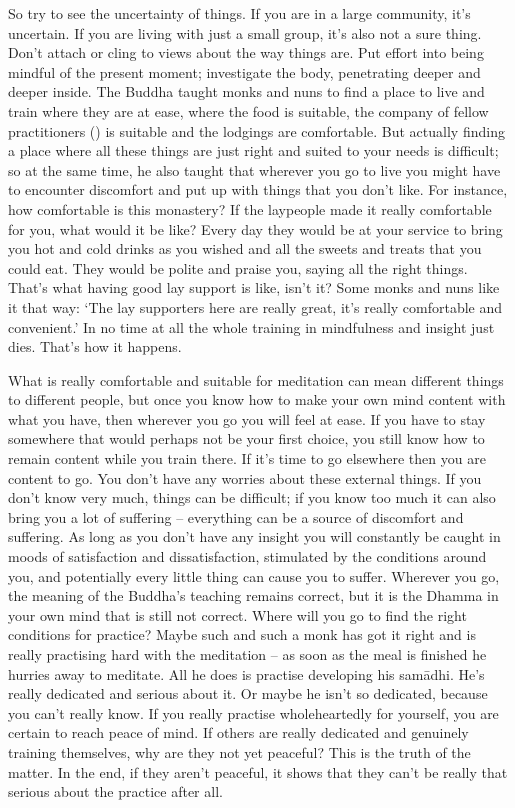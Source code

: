 So try to see the uncertainty of things. If you are in a large community, it's uncertain. If you are living with just a small group, it's also not a sure thing. Don't attach or cling to views about the way things are. Put effort into being mindful of the present moment; investigate the body, penetrating deeper and deeper inside. The Buddha taught monks and nuns to find a place to live and train where they are at ease, where the food is suitable, the company of fellow practitioners () is suitable and the lodgings are comfortable. But actually finding a place where all these things are just right and suited to your needs is difficult; so at the same time, he also taught that wherever you go to live you might have to encounter discomfort and put up with things that you don't like. For instance, how comfortable is this monastery? If the laypeople made it really comfortable for you, what would it be like? Every day they would be at your service to bring you hot and cold drinks as you wished and all the sweets and treats that you could eat. They would be polite and praise you, saying all the right things. That's what having good lay support is like, isn't it? Some monks and nuns like it that way: `The lay supporters here are really great, it's really comfortable and convenient.' In no time at all the whole training in mindfulness and insight just dies. That's how it happens.

What is really comfortable and suitable for meditation can mean different things to different people, but once you know how to make your own mind content with what you have, then wherever you go you will feel at ease. If you have to stay somewhere that would perhaps not be your first choice, you still know how to remain content while you train there. If it's time to go elsewhere then you are content to go. You don't have any worries about these external things. If you don't know very much, things can be difficult; if you know too much it can also bring you a lot of suffering -- everything can be a source of discomfort and suffering. As long as you don't have any insight you will constantly be caught in moods of \mbox{satisfaction} and dissatisfaction, stimulated by the conditions around you, and potentially every little thing can cause you to suffer. Wherever you go, the meaning of the Buddha's teaching remains correct, but it is the Dhamma in your own mind that is still not correct. Where will you go to find the right conditions for practice? Maybe such and such a monk has got it right and is really practising hard with the meditation -- as soon as the meal is finished he hurries away to meditate. All he does is practise developing his sam\=adhi. He's really dedicated and serious about it. Or maybe he isn't so dedicated, because you can't really know. If you really practise wholeheartedly for yourself, you are certain to reach peace of mind. If others are really dedicated and genuinely training themselves, why are they not yet peaceful? This is the truth of the matter. In the end, if they aren't peaceful, it shows that they can't be really that serious about the practice after all.

